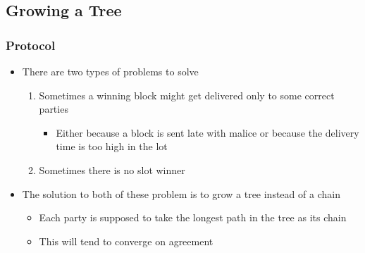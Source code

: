 \documentclass[11pt]{article}
\begin{document}
\subsection{Growing a Tree}
\label{sec:orgd1af220}
\subsubsection{Protocol}
\label{sec:orgc89c091}
\begin{itemize}
\item There are two types of problems to solve
\begin{enumerate}
\item Sometimes a winning block might get delivered only to some correct parties
\begin{itemize}
\item Either because a block is sent late with malice or because the delivery time is too high in the lot
\end{itemize}
\item Sometimes there is no slot winner
\end{enumerate}

\item The solution to both of these problem is to grow a tree instead of a chain
\begin{itemize}
\item Each party is supposed to take the longest path in the tree as its chain
\item This will tend to converge on agreement
\end{itemize}


\end{itemize}
\end{document}
